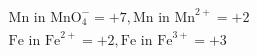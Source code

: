 \documentclass[preview]{standalone}
\begin{document}
\begin{align*}
\text{Mn in MnO}_4^- = +7, \text{Mn in Mn}^{2+} = +2 \\ \text{Fe in Fe}^{2+} = +2, \text{Fe in Fe}^{3+} = +3
\end{align*}
\end{document}
